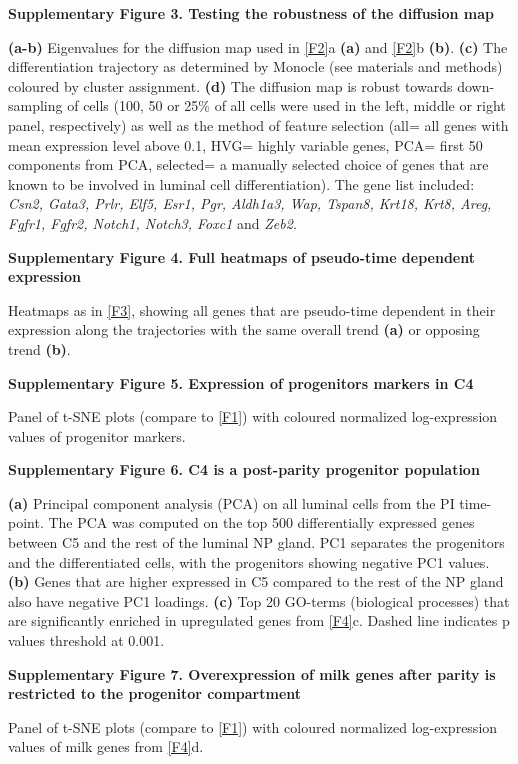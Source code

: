 \documentclass[titlepage, 12pt, oneside]{amsart}
\begin{document}
\textbf{Supplementary Figure 3. Testing the robustness of the diffusion
map}

\textbf{(a-b)} Eigenvalues for the diffusion map used in \autoref{F2}a
\textbf{(a)} and \autoref{F2}b \textbf{(b)}. 
\textbf{(c)} The differentiation trajectory as determined by Monocle (see materials and methods) coloured by cluster assignment.
\textbf{(d)} The diffusion map is robust towards down-sampling of cells (100, 50 or 25\% of all cells were used in the left, middle or right panel, respectively) as well as the method of feature selection (all= all genes with mean expression level above 0.1, HVG= highly variable genes, PCA= first 50 components from PCA, selected= a manually selected choice of genes that are known to be involved in luminal cell differentiation).
The gene list included: \textit{Csn2, Gata3, Prlr, Elf5, Esr1, Pgr, Aldh1a3, Wap, Tspan8, Krt18, Krt8, Areg, Fgfr1, Fgfr2, Notch1, Notch3, Foxc1} and \textit{Zeb2}.

\textbf{Supplementary Figure 4. Full heatmaps of pseudo-time dependent
expression}

Heatmaps as in \autoref{F3}, showing all genes that are pseudo-time dependent in their expression along the trajectories with the same overall trend \textbf{(a)} or opposing trend \textbf{(b)}.

\textbf{Supplementary Figure 5. Expression of progenitors markers in C4}

Panel of t-SNE plots (compare to \autoref{F1}) with coloured normalized log-expression values of progenitor markers.

\textbf{Supplementary Figure 6. C4 is a post-parity progenitor
population }

\textbf{(a)} Principal component analysis (PCA) on all luminal cells from the PI time-point.
The PCA was computed on the top 500 differentially expressed genes between C5 and the rest of the luminal NP gland.
PC1 separates the progenitors and the differentiated cells, with the progenitors showing negative PC1 values.
\textbf{(b)} Genes that are higher expressed in C5 compared to the rest of the NP gland also have negative PC1 loadings.
\textbf{(c)} Top 20 GO-terms (biological processes) that are significantly enriched in upregulated genes from \autoref{F4}c.
Dashed line indicates p values threshold at 0.001.

\textbf{Supplementary Figure 7. Overexpression of milk genes after
parity is restricted to the progenitor compartment}

Panel of t-SNE plots (compare to \autoref{F1}) with coloured normalized log-expression values of milk genes from \autoref{F4}d.
\end{document}
